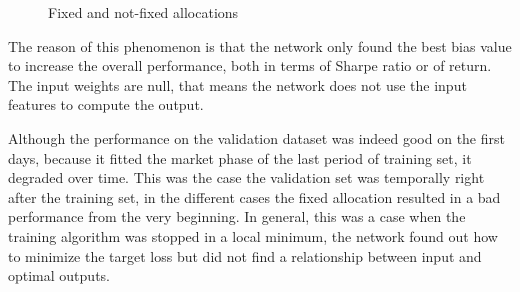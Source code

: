 \begin{figure}[h]
    \centering
    \qquad
    \caption[Fixed allocation anomaly]{Fixed and not-fixed allocations}%
    \label{fig:with_without_bias}%
\end{figure}

\hfill \break

The reason of this phenomenon is that the network only found the best bias value to increase the overall performance, both in terms of Sharpe ratio or of return. The input weights are null, that means the network does not use the input features to compute the output. 
\hfill \break

Although the performance on the validation dataset was indeed good on the first days, because it fitted the market phase of the last period of training set, it degraded over time. This was the case the validation set was temporally right after the training set, in the different cases the fixed allocation resulted in a bad performance from the very beginning.  In general, this was a case when the training algorithm was stopped in a local minimum, the network found out how to minimize the target loss but did not find a relationship between input and optimal outputs.

